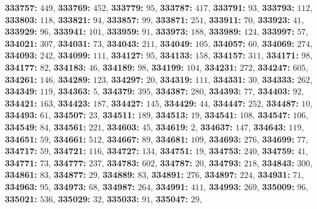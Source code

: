 \textsf{\bfseries 333757:} $449$, \textsf{\bfseries 333769:} $452$, \textsf{\bfseries 333779:} $95$, \textsf{\bfseries 333787:} $417$, \textsf{\bfseries 333791:} $93$, \textsf{\bfseries 333793:} $112$, \textsf{\bfseries 333803:} $118$, \textsf{\bfseries 333821:} $94$, \textsf{\bfseries 333857:} $99$, \textsf{\bfseries 333871:} $251$, \textsf{\bfseries 333911:} $70$, \textsf{\bfseries 333923:} $41$, \textsf{\bfseries 333929:} $96$, \textsf{\bfseries 333941:} $101$, \textsf{\bfseries 333959:} $91$, \textsf{\bfseries 333973:} $188$, \textsf{\bfseries 333989:} $124$, \textsf{\bfseries 333997:} $57$, \textsf{\bfseries 334021:} $307$, \textsf{\bfseries 334031:} $73$, \textsf{\bfseries 334043:} $211$, \textsf{\bfseries 334049:} $105$, \textsf{\bfseries 334057:} $60$, \textsf{\bfseries 334069:} $274$, \textsf{\bfseries 334093:} $242$, \textsf{\bfseries 334099:} $111$, \textsf{\bfseries 334127:} $95$, \textsf{\bfseries 334133:} $158$, \textsf{\bfseries 334157:} $311$, \textsf{\bfseries 334171:} $98$, \textsf{\bfseries 334177:} $82$, \textsf{\bfseries 334183:} $46$, \textsf{\bfseries 334189:} $98$, \textsf{\bfseries 334199:} $104$, \textsf{\bfseries 334231:} $272$, \textsf{\bfseries 334247:} $605$, \textsf{\bfseries 334261:} $146$, \textsf{\bfseries 334289:} $123$, \textsf{\bfseries 334297:} $20$, \textsf{\bfseries 334319:} $111$, \textsf{\bfseries 334331:} $30$, \textsf{\bfseries 334333:} $262$, \textsf{\bfseries 334349:} $119$, \textsf{\bfseries 334363:} $5$, \textsf{\bfseries 334379:} $395$, \textsf{\bfseries 334387:} $280$, \textsf{\bfseries 334393:} $77$, \textsf{\bfseries 334403:} $92$, \textsf{\bfseries 334421:} $163$, \textsf{\bfseries 334423:} $187$, \textsf{\bfseries 334427:} $145$, \textsf{\bfseries 334429:} $44$, \textsf{\bfseries 334447:} $252$, \textsf{\bfseries 334487:} $10$, \textsf{\bfseries 334493:} $61$, \textsf{\bfseries 334507:} $23$, \textsf{\bfseries 334511:} $189$, \textsf{\bfseries 334513:} $19$, \textsf{\bfseries 334541:} $108$, \textsf{\bfseries 334547:} $106$, \textsf{\bfseries 334549:} $84$, \textsf{\bfseries 334561:} $221$, \textsf{\bfseries 334603:} $45$, \textsf{\bfseries 334619:} $2$, \textsf{\bfseries 334637:} $147$, \textsf{\bfseries 334643:} $119$, \textsf{\bfseries 334651:} $59$, \textsf{\bfseries 334661:} $512$, \textsf{\bfseries 334667:} $89$, \textsf{\bfseries 334681:} $109$, \textsf{\bfseries 334693:} $276$, \textsf{\bfseries 334699:} $77$, \textsf{\bfseries 334717:} $59$, \textsf{\bfseries 334721:} $116$, \textsf{\bfseries 334727:} $134$, \textsf{\bfseries 334751:} $19$, \textsf{\bfseries 334753:} $240$, \textsf{\bfseries 334759:} $41$, \textsf{\bfseries 334771:} $73$, \textsf{\bfseries 334777:} $237$, \textsf{\bfseries 334783:} $602$, \textsf{\bfseries 334787:} $20$, \textsf{\bfseries 334793:} $218$, \textsf{\bfseries 334843:} $300$, \textsf{\bfseries 334861:} $83$, \textsf{\bfseries 334877:} $29$, \textsf{\bfseries 334889:} $83$, \textsf{\bfseries 334891:} $276$, \textsf{\bfseries 334897:} $224$, \textsf{\bfseries 334931:} $71$, \textsf{\bfseries 334963:} $95$, \textsf{\bfseries 334973:} $68$, \textsf{\bfseries 334987:} $264$, \textsf{\bfseries 334991:} $411$, \textsf{\bfseries 334993:} $269$, \textsf{\bfseries 335009:} $96$, \textsf{\bfseries 335021:} $536$, \textsf{\bfseries 335029:} $32$, \textsf{\bfseries 335033:} $91$, \textsf{\bfseries 335047:} $29$, 

